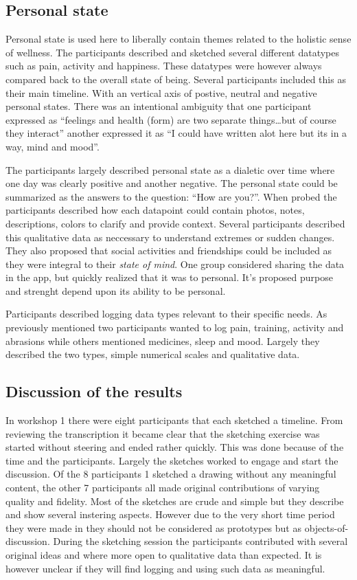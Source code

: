 \documentclass[11pt,UKenglish, a4paper]{article}
\begin{document}
\subsection{Personal state}
Personal state is used here to liberally contain themes related to the holistic sense of wellness. The participants described and sketched several different datatypes such as pain, activity and happiness. These datatypes were however always compared back to the overall state of being. Several participants included this as their main timeline. With an vertical axis of postive, neutral and negative personal states. There was an intentional ambiguity that one participant expressed as ``feelings and health (form) are two separate things\dots but of course they interact'' another expressed it as ``I could have written alot here but its in a way, mind and mood''. 

The participants largely described personal state as a dialetic over time where one day was clearly positive and another negative. The personal state could be summarized as the answers to the question: ``How are you?''. When probed the participants described how each datapoint could contain photos, notes, descriptions, colors to clarify and provide context. Several participants described this qualitative data as neccessary to understand extremes or sudden changes. They also proposed that social activities and friendships could be included as they were integral to their \textit{state of mind}. One group considered sharing the data in the app, but quickly realized that it was to personal. It's proposed purpose and strenght depend upon its ability to be personal. 

Participants described logging data types relevant to their specific needs. As previously mentioned two participants wanted to log pain, training, activity and abrasions while others mentioned medicines, sleep and mood. Largely they described the two types, simple numerical scales and qualitative data. 

\subsection{Discussion of the results}
In workshop 1 there were eight participants that each sketched a timeline. From reviewing the transcription it became clear that the sketching exercise was started without steering and ended rather quickly. This was done because of the time and the participants. Largely the sketches worked to engage and start the discussion. Of the 8 participants 1 sketched a drawing without any meaningful content, the other 7 participants all made original contributions of varying quality and fidelity. Most of the sketches are crude and simple but they describe and show several instering aspects. However due to the very short time period they were made in they should not be considered as prototypes but as objects-of-discussion. 
During the sketching session the participants contributed with several original ideas and where more open to qualitative data than expected. It is however unclear if they will find logging and using such data as meaningful.
\end{document}
